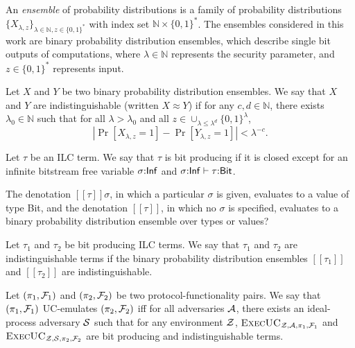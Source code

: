 \documentclass[acmsmall,review,anonymous]{acmart}\settopmatter{printfolios=true,printccs=false,printacmref=false}
\begin{document}
\begin{definition}
An \emph{ensemble} of probability distributions is a family of probability
distributions $\{ X_{\lambda, z} \}_{\lambda \in \mathbb{N}, z \in {\{0,1\}}^{*}}$ with index
set $\mathbb{N} \times \{0,1\}^{*}$.  The ensembles considered in this work are binary probability
distribution ensembles, which describe single bit outputs of computations, where
$\lambda \in \mathbb{N}$ represents the security parameter, and $z \in \{0,1\}^{*}$
represents input.
\end{definition}

\begin{definition}[Indistinguishability]
Let $X$ and $Y$ be two binary probability distribution
ensembles. We say that $X$ and $Y$ are indistinguishable
(written $X \approx Y$) if for any $c, d \in \mathbb{N}$, there exists
$\lambda_0 \in \mathbb{N}$ such that for all $\lambda > \lambda_0$ and all $z \in \cup_{\lambda \leq \lambda^d}\{0,1\}^{\lambda}$,
\[ | \Pr[X_{\lambda, z} = 1] - \Pr[Y_{\lambda, z} = 1] | < \lambda^{-c}. \]
\end{definition}

\begin{definition}
Let $\tau$ be an ILC term. We say that $\tau$ is bit producing if it is closed except
for an infinite bitstream free variable $\sigma{:}{\sf Inf}$ and $\sigma{:}{\sf Inf} \vdash
\tau{:}{\sf Bit}$.
\end{definition}

\noindent The denotation $[\![\tau]\!]\sigma$, in which a particular $\sigma$ is
given, evaluates to a value of type {\sf Bit}, and the denotation $[\![\tau]\!]$,
in which no $\sigma$ is specified, evaluates to a binary probability distribution
ensemble over types or values?

\begin{definition}
Let $\tau_1$ and $\tau_2$ be bit producing ILC terms. We say that $\tau_1$ and $\tau_2$ are
indistinguishable terms if the binary probability distribution ensembles
$[\![\tau_1]\!]$ and $[\![\tau_2]\!]$ are indistinguishable.
\end{definition}

\begin{definition}
Let $(\pi_1, \mathcal{F}_1)$ and $(\pi_2, \mathcal{F}_2)$ be two protocol-functionality
pairs. We say that $(\pi_1, \mathcal{F}_1)$ UC-emulates $(\pi_2, \mathcal{F}_2)$ iff for all
adversaries $\mathcal{A}$, there exists an ideal-process adversary $\mathcal{S}$ such that
for any environment $\mathcal{Z}$,
$\textsc{ExecUC}_{\mathcal{Z}, \mathcal{A}, \pi_1, \mathcal{F}_1}$ and
$\textsc{ExecUC}_{\mathcal{Z}, \mathcal{S}, \pi_2, \mathcal{F}_2}$ are bit producing and
indistinguishable terms.
\end{definition}
\end{document}
